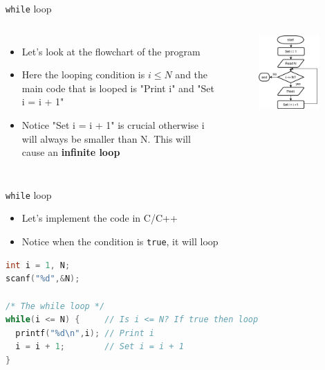 \documentclass[10pt,xcolor={table,dvipsnames},t]{beamer}
\begin{document}
\begin{frame}{\texttt{while} loop}
  \begin{columns}
    \begin{itemize}
      \item Let's look at the flowchart of the program
      \item Here the looping condition is $i \leq N$ and the main code that is looped is "Print i" and "Set i = i + 1"
      \item Notice "Set i = i + 1" is crucial otherwise i will always be smaller than N. This will cause an \textbf{infinite loop}
    \end{itemize}
    \begin{figure}
      \includegraphics[width=0.9\textwidth]{img/print_first_n_flowchart.png}
    \end{figure}
  \end{columns}
\end{frame}

\begin{frame}[fragile]{\texttt{while} loop}
  \begin{itemize}
    \item Let's implement the code in C/C++
    \item Notice when the condition is \texttt{true}, it will loop
  \end{itemize}
\begin{lstlisting}[language=C]
int i = 1, N;
scanf("%d",&N);

/* The while loop */
while(i <= N) {     // Is i <= N? If true then loop
  printf("%d\n",i); // Print i 
  i = i + 1;        // Set i = i + 1
}
\end{lstlisting}
\end{frame}
\end{document}
